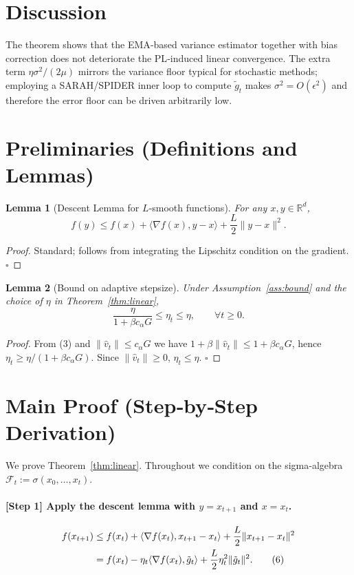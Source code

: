 \documentclass{article}
\newtheorem{lemma}{Lemma}
\begin{document}
\section*{Discussion}
The theorem shows that the EMA‑based variance estimator together with bias correction does not deteriorate the PL‑induced linear convergence.  The extra term $\eta\sigma^{2}/(2\mu)$ mirrors the variance floor typical for stochastic methods; employing a SARAH/SPIDER inner loop to compute $\tilde g_t$ makes $\sigma^{2}=O(\epsilon^{2})$ and therefore the error floor can be driven arbitrarily low.

\newpage

\section*{Preliminaries (Definitions and Lemmas)}
\begin{lemma}[Descent Lemma for $L$‑smooth functions]\label{lem:descent}
For any $x,y\in\mathbb{R}^{d}$,
\[
f(y)\le f(x)+\langle\nabla f(x),y-x\rangle+\frac{L}{2}\|y-x\|^{2}.
\]
\end{lemma}
\begin{proof}
Standard; follows from integrating the Lipschitz condition on the gradient. \hfill $\square$
\end{proof}

\begin{lemma}[Bound on adaptive stepsize]\label{lem:stepbound}
Under Assumption~\ref{ass:bound} and the choice of $\eta$ in Theorem~\ref{thm:linear},
\[
\frac{\eta}{1+\beta c_\alpha G}\le \eta_t\le \eta,\qquad\forall t\ge0.
\]
\end{lemma}
\begin{proof}
From (3) and $\|\hat v_t\|\le c_\alpha G$ we have 
$1+\beta\|\hat v_t\|\le 1+\beta c_\alpha G$, hence $\eta_t\ge \eta/(1+\beta c_\alpha G)$. 
Since $\|\hat v_t\|\ge0$, $\eta_t\le\eta$. \hfill $\square$
\end{proof}

\section*{Main Proof (Step‑by‑Step Derivation)}
We prove Theorem~\ref{thm:linear}.  Throughout we condition on the sigma‑algebra $\mathcal{F}_t:=\sigma(x_0,\dots,x_t)$.

\paragraph{[Step 1] Apply the descent lemma with $y=x_{t+1}$ and $x=x_t$.}
\begin{align}
f(x_{t+1})
&\le f(x_t)+\langle\nabla f(x_t),x_{t+1}-x_t\rangle+\frac{L}{2}\|x_{t+1}-x_t\|^{2}
\notag\\
&= f(x_t)-\eta_t\langle\nabla f(x_t),\tilde g_t\rangle+\frac{L}{2}\eta_t^{2}\|\tilde g_t\|^{2}.
\tag{6}
\end{align}
\end{document}
